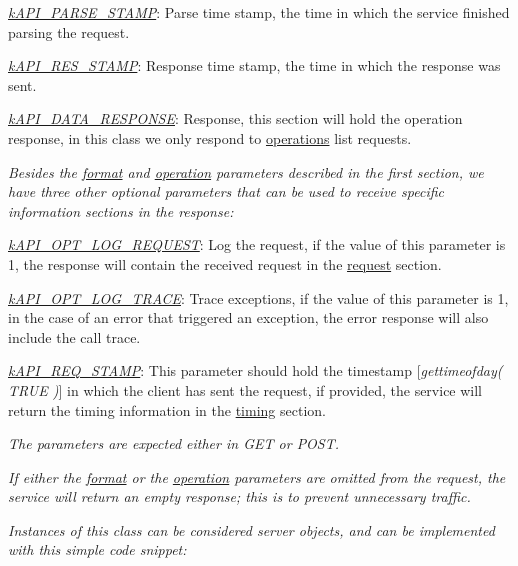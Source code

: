 {\begin{DoxyItemize}
\begin{DoxyItemize}
\item {\itshape \hyperlink{}{k\-A\-P\-I\-\_\-\-P\-A\-R\-S\-E\-\_\-\-S\-T\-A\-M\-P}}\-: Parse time stamp, the time in which the service finished parsing the request. 
\item {\itshape \hyperlink{}{k\-A\-P\-I\-\_\-\-R\-E\-S\-\_\-\-S\-T\-A\-M\-P}}\-: Response time stamp, the time in which the response was sent. 
\end{DoxyItemize}
\item {\itshape \hyperlink{}{k\-A\-P\-I\-\_\-\-D\-A\-T\-A\-\_\-\-R\-E\-S\-P\-O\-N\-S\-E}}\-: Response, this section will hold the operation response, in this class we only respond to \hyperlink{}{operations} list requests. 
\end{DoxyItemize}}

{\itshape Besides the \hyperlink{}{format} and \hyperlink{}{operation} parameters described in the first section, we have three other optional parameters that can be used to receive specific information sections in the response\-:}

{\itshape 
\begin{DoxyItemize}
\item {\itshape \hyperlink{}{k\-A\-P\-I\-\_\-\-O\-P\-T\-\_\-\-L\-O\-G\-\_\-\-R\-E\-Q\-U\-E\-S\-T}}\-: Log the request, if the value of this parameter is 1, the response will contain the received request in the \hyperlink{}{request} section. 
\item {\itshape \hyperlink{}{k\-A\-P\-I\-\_\-\-O\-P\-T\-\_\-\-L\-O\-G\-\_\-\-T\-R\-A\-C\-E}}\-: Trace exceptions, if the value of this parameter is 1, in the case of an error that triggered an exception, the error response will also include the call trace. 
\item {\itshape \hyperlink{}{k\-A\-P\-I\-\_\-\-R\-E\-Q\-\_\-\-S\-T\-A\-M\-P}}\-: This parameter should hold the timestamp \mbox{[}{\itshape gettimeofday( T\-R\-U\-E )}\mbox{]} in which the client has sent the request, if provided, the service will return the timing information in the \hyperlink{}{timing} section. 
\end{DoxyItemize}}

{\itshape The parameters are expected either in {\itshape G\-E\-T} or {\itshape P\-O\-S\-T}.}

{\itshape If either the \hyperlink{}{format} or the \hyperlink{}{operation} parameters are omitted from the request, the service will return an empty response; this is to prevent unnecessary traffic.}

{\itshape Instances of this class can be considered server objects, and can be implemented with this simple code snippet\-:}

